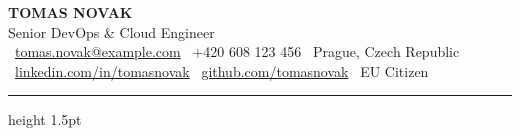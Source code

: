 \documentclass[10pt,a4paper]{article}
\begin{document}
\begin{center}
  {\Huge\bfseries\color{accent} TOMAS NOVAK} \\
  \vspace{4pt}
  {\Large\mdseries\color{darkneutral} Senior DevOps \& Cloud Engineer} \\
  \vspace{8pt}
  {\small\color{textgray}
    \faEnvelope\ \href{mailto:tomas.novak@example.com}{tomas.novak@example.com} \quad \textbar \quad
    \faPhone\ +420 608 123 456 \quad \textbar \quad
    \faMapMarker*\ Prague, Czech Republic \\
    \vspace{4pt}
    \faLinkedin\ \href{https://linkedin.com/in/tomasnovak}{linkedin.com/in/tomasnovak} \quad \textbar \quad
    \faGithub\ \href{https://github.com/tomasnovak}{github.com/tomasnovak} \quad \textbar \quad
    \faGlobe\ EU Citizen
  }
\end{center}

\vspace{10pt}
\hrule height 1.5pt \relax
\vspace{10pt}

\setlength{\columnsep}{0.8cm}
\setlength{\columnseprule}{0.5pt}
\end{document}
